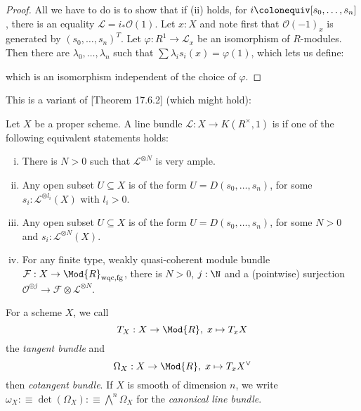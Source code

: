 \begin{proof}
  All we have to do is to show that if (ii) holds, for $i\colonequiv [s_0,\dots,s_n]$,
  there is an equality $\mathcal L=i_\ast \mathcal O(1)$.
  Let $x:X$ and note first that $\mathcal O(-1)_x$ is generated by $(s_0,\dots,s_n)^T$.
  Let $\varphi:R^1\to \mathcal L_x$ be an isomorphism of $R$-modules.
  Then there are $\lambda_0,\dots,\lambda_n$ such that $\sum \lambda_i s_i(x) =\varphi(1)$,
  which lets us define:
  \begin{center}
  \end{center}
  which is an isomorphism independent of the choice of $\varphi$.
\end{proof}

This is a variant of \cite{vakil}[Theorem 17.6.2] (which might hold):

\begin{definition}
  Let $X$ be a proper scheme.
  A line bundle $\mathcal L : X\to K(R^\times,1)$ is 
  if one of the following equivalent statements holds:
  \begin{enumerate}[(i)]
  \item There is $N>0$ such that $\mathcal L^{\otimes N}$ is very ample.
  \item Any open subset $U\subseteq X$ is of the form $U=D(s_0,\dots,s_n)$,
    for some $s_i:\mathcal L^{\otimes l_i}(X)$ with $l_i>0$.
  \item Any open subset $U\subseteq X$ is of the form $U=D(s_0,\dots,s_n)$,
    for some $N>0$ and $s_i:\mathcal L^{\otimes N}(X)$.
  \item For any finite type, weakly quasi-coherent module bundle $\mathcal F:X\to \Mod{R}_{\mathrm{wqc,fg}}$,
    there is $N>0$, $j:\N$ and a (pointwise) surjection
    $\mathcal O^{\oplus j}\to \mathcal F\otimes \mathcal L^{\otimes N}$.
  \end{enumerate}
\end{definition}

\begin{definition}
  For a scheme $X$, we call
  \[
    T_X : X \to \Mod{R},\; x \mapsto T_xX
  \]
  the \emph{tangent bundle} and
  \[
    \Omega_X : X \to \Mod{R},\; x \mapsto T_xX^\vee
  \]
  then \emph{cotangent bundle}.
  If $X$ is smooth of dimension $n$, we write $\omega_X :\equiv \det(\Omega_X) :\equiv \bigwedge^n\Omega_X$ for the  \emph{canonical line bundle}.
\end{definition}

